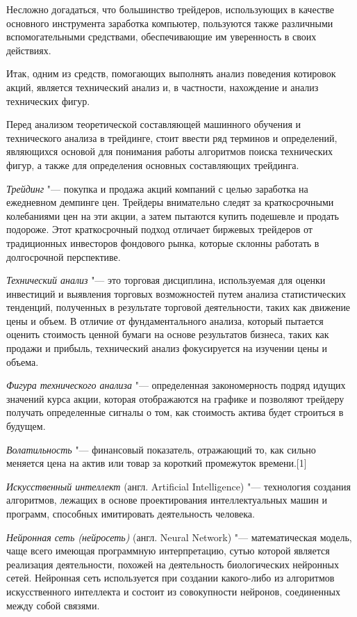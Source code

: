 \documentclass[bachelor, och, coursework]{SCWorks}
\begin{document}
    Несложно догадаться, что большинство трейдеров, использующих в качестве
    основного инструмента заработка компьютер, пользуются также различными
    вспомогательными средствами, обеспечивающие им уверенность в своих действиях.

    Итак, одним из средств, помогающих выполнять анализ поведения котировок
    акций, является технический анализ и, в частности, нахождение и анализ
    технических фигур.

    Перед анализом теоретической составляющей машинного обучения и технического
    анализа в трейдинге, стоит ввести ряд терминов и определений,
    являющихся основой для понимания работы алгоритмов поиска технических фигур,
    а также для определения основных составляющих трейдинга.

    \textit{Трейдинг} "--- покупка и продажа акций компаний с целью заработка на 
    ежедневном демпинге цен. Трейдеры внимательно следят за краткосрочными 
    колебаниями цен на эти акции, а затем пытаются купить подешевле и продать 
    подороже. Этот краткосрочный подход отличает биржевых трейдеров от 
    традиционных инвесторов фондового рынка, которые склонны работать в 
    долгосрочной перспективе.

    \textit{Технический анализ} "--- это торговая дисциплина, используемая для 
    оценки инвестиций и выявления торговых возможностей путем анализа статистических 
    тенденций, полученных в результате торговой деятельности, таких как движение 
    цены и объем. В отличие от фундаментального анализа, который пытается оценить 
    стоимость ценной бумаги на основе результатов бизнеса, таких как продажи и 
    прибыль, технический анализ фокусируется на изучении цены и объема.

    \textit{Фигура технического анализа} "--- определенная закономерность подряд 
    идущих значений курса акции, которая отображаются на графике и позволяют 
    трейдеру получать определенные сигналы о том, как стоимость актива будет 
    строиться в будущем.

    \textit{Волатильность} "--- финансовый показатель, отражающий то, как сильно 
    меняется цена на актив или товар за короткий промежуток времени.[1]

    \textit{Искусственный интеллект} (англ. Artificial Intelligence) "---
    технология создания алгоритмов, лежащих в основе проектирования
    интеллектуальных машин и программ, способных имитировать деятельность
    человека.

    \textit{Нейронная сеть (нейросеть)} (англ. Neural Network) "---
    математическая модель, чаще всего имеющая программную интерпретацию, сутью
    которой является реализация деятельности, похожей на деятельность
    биологических нейронных сетей. Нейронная сеть используется при создании
    какого-либо из алгоритмов искусственного интеллекта и состоит из
    совокупности нейронов, соединенных между собой связями. 
\end{document}
